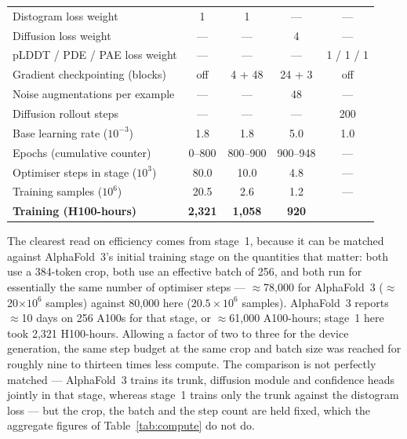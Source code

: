 \documentclass[11pt]{article}
\newcommand{\todo}[1]{{\color{draft}\itshape\small[#1]}}
\begin{document}
\begin{table}[t]
\begin{tabularx}{\linewidth}{@{}Xcccc@{}}
\addlinespace[2pt]
\rmfamily Distogram loss weight                & 1 & 1 & --- & --- \\
\rmfamily Diffusion loss weight                & --- & --- & 4 & --- \\
\rmfamily pLDDT / PDE / PAE loss weight        & --- & --- & --- & 1 / 1 / 1 \\
\addlinespace[2pt]
\rmfamily Gradient checkpointing (blocks)      & off & 4 + 48 & 24 + 3 & off \\
\rmfamily Noise augmentations per example      & --- & --- & 48 & --- \\
\rmfamily Diffusion rollout steps              & --- & --- & --- & 200 \\
\rmfamily Base learning rate ($10^{-3}$)       & 1.8 & 1.8 & 5.0 & 1.0 \\
\addlinespace[2pt]
\rmfamily Epochs (cumulative counter)          & 0--800 & 800--900 & 900--948 & --- \\
\rmfamily Optimiser steps in stage ($10^{3}$)  & 80.0 & 10.0 & 4.8 & --- \\
\rmfamily Training samples ($10^{6}$)          & 20.5 & 2.6 & 1.2 & --- \\
\rmfamily \textbf{Training (H100-hours)}       & \textbf{2{,}321} & \textbf{1{,}058} & \textbf{920} & \rmfamily\todo{--} \\
\bottomrule
\end{tabularx}
\end{table}

The clearest read on efficiency comes from stage~1, because it can be matched
against AlphaFold~3's initial training stage on the quantities that matter:
both use a 384-token crop, both use an effective batch of 256, and both run for
essentially the same number of optimiser steps --- $\approx$78{,}000 for
AlphaFold~3 ($\approx$20$\times10^{6}$ samples) against 80{,}000 here
($20.5\times10^{6}$ samples). AlphaFold~3 reports $\approx$10 days on 256
A100s for that stage, or $\approx$61{,}000 A100-hours; stage~1 here took
2{,}321 H100-hours. Allowing a factor of two to three for the device
generation, the same step budget at the same crop and batch size was reached
for roughly nine to thirteen times less compute. The comparison is not
perfectly matched --- AlphaFold~3 trains its trunk, diffusion module and
confidence heads jointly in that stage, whereas stage~1 trains only the trunk
against the distogram loss --- but the crop, the batch and the step count are
held fixed, which the aggregate figures of Table~\ref{tab:compute} do not do.
\end{document}
